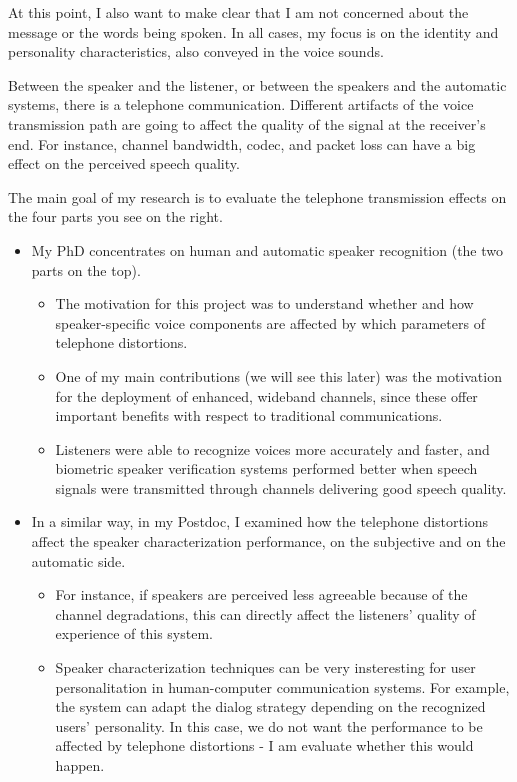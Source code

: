 \documentclass[a4paper]{article}
\begin{document}
At this point, I also want to make clear that I am not concerned about the message or the words being spoken. In all cases, my focus is on the identity and personality characteristics, also conveyed in the voice sounds.

Between the speaker and the listener, or between the speakers and the automatic systems, there is a telephone communication. Different artifacts of the voice transmission path are going to affect the quality of the signal at the receiver's end. For instance, channel bandwidth, codec, and packet loss can have a big effect on the perceived speech quality.

The main goal of my research is to evaluate the telephone transmission effects on the four parts you see on the right. 

\begin{itemize}
\item My PhD concentrates on human and automatic speaker recognition (the two parts on the top). 

\begin{itemize}
\item The motivation for this project was to understand whether and how speaker-specific voice components are affected by which parameters of telephone distortions. 

\item One of my main contributions (we will see this later) was the motivation for the deployment of enhanced, wideband channels, since these offer important benefits with respect to traditional communications. 

\item Listeners were able to recognize voices more accurately and faster, and biometric speaker verification systems performed better when speech signals were transmitted through channels delivering good speech quality.
\end{itemize}



\item In a similar way, in my Postdoc, I examined how the telephone distortions affect the speaker characterization performance, on the subjective and on the automatic side. 

\begin{itemize}
\item For instance, if speakers are perceived less agreeable because of the channel degradations, this can directly affect the listeners' quality of experience of this system. 

\item Speaker characterization techniques can be very insteresting for user personalitation in human-computer communication systems. For example, the system can adapt the dialog strategy depending on the recognized users' personality. In this case, we do not want the performance to be affected by telephone distortions - I am evaluate whether this would happen.

\end{itemize}

\end{itemize}
\end{document}
